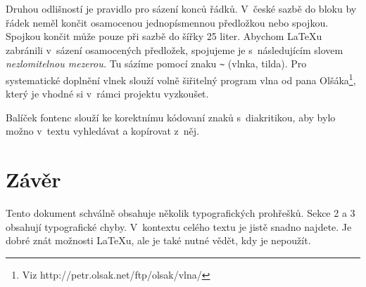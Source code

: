 \documentclass[10pt, twocolumn, a4paper]{article}
\begin{document}
Druhou odlišností je pravidlo pro sázení konců řádků.
V~české sazbě do bloku by řádek neměl končit osamocenou jednopísmennou předložkou nebo spojkou.
Spojkou  končit může pouze při sazbě do šířky 25 liter.
Abychom \LaTeX u zabránili v~sázení osamocených předložek, spojujeme je s~následujícím slovem \textit{nezlomitelnou mezerou.}
Tu sázíme pomocí znaku \verb|~| (vlnka, tilda).
Pro systematické doplnění vlnek slouží volně šiřitelný program vlna od pana Olšáka\footnote[2]{Viz http://petr.olsak.net/ftp/olsak/vlna/}, který je vhodné si v~rámci projektu vyzkoušet.

Balíček fontenc slouží ke korektnímu kódovaní znaků s~diakritikou, aby bylo možno v~textu vyhledávat a kopírovat z~něj.


\section{Závěr}

Tento dokument schválně obsahuje několik typografických prohřešků.
Sekce 2 a 3 obsahují typografické chyby.
V~kontextu celého textu je jistě snadno najdete.
Je dobré znát možnosti LaTeXu, ale je také nutné vědět, kdy je nepoužít.
\end{document}
